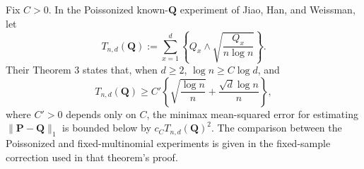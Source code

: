 Fix \(C>0\).  In the Poissonized known-\(\mathbf Q\) experiment of Jiao, Han, and Weissman, let
\[
 T_{n,d}(\mathbf Q)
 :=\sum_{x=1}^d\left\{Q_x\wedge\sqrt{\frac{Q_x}{n\log n}}\right\}.
\]
Their Theorem 3 states that, when \(d\ge2\), \(\log n\ge C\log d\), and
\[
 T_{n,d}(\mathbf Q)
 \ge C'\left\{\sqrt{\frac{\log n}{n}}+\frac{\sqrt d\log n}{n}\right\},
\]
where \(C'>0\) depends only on \(C\), the minimax mean-squared error for estimating \(\lVert\mathbf P-\mathbf Q\rVert_1\) is bounded below by \(c_C T_{n,d}(\mathbf Q)^2\).  The comparison between the Poissonized and fixed-multinomial experiments is given in the fixed-sample correction used in that theorem's proof.